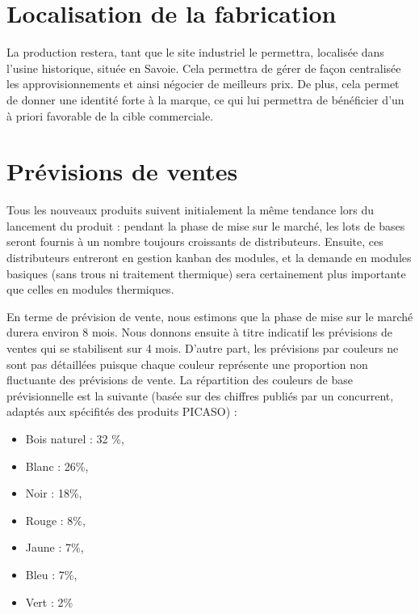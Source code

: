 \section{Localisation de la fabrication}
La production restera, tant que le site industriel le permettra,
localisée dans l'usine historique, située en Savoie. Cela permettra de
gérer de façon centralisée les approvisionnements et ainsi négocier de
meilleurs prix. De plus, cela permet de donner une identité forte à la
marque, ce qui lui permettra de bénéficier d'un à priori favorable de la
cible commerciale.

\section{Prévisions de ventes}
Tous les nouveaux produits suivent initialement la même tendance lors du
lancement du produit : pendant la phase de mise sur le marché, les lots
de bases seront fournis à un nombre toujours croissants de
distributeurs. Ensuite, ces distributeurs entreront en gestion kanban
des modules, et la demande en modules basiques (sans trous ni traitement
thermique) sera certainement plus importante que celles en modules
thermiques.

En terme de prévision de vente, nous estimons que la phase de mise sur le
marché durera environ 8 mois. Nous donnons ensuite à titre indicatif les
prévisions de ventes qui se stabilisent sur 4 mois. D'autre part, les
prévisions par couleurs ne sont pas détaillées puisque chaque couleur
représente une proportion non fluctuante des prévisions de vente. La
répartition des couleurs de base prévisionnelle est la suivante (basée
sur des chiffres publiés par un concurrent, adaptés aux spécifités des
produits PICASO) :

\begin{itemize}
\item Bois naturel : 32 \%,
\item Blanc : 26\%,
\item Noir : 18\%,
\item Rouge : 8\%,
\item Jaune : 7\%,
\item Bleu : 7\%,
\item Vert : 2\%
\end{itemize}

